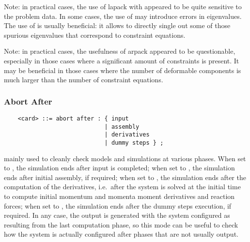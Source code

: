Note: in practical cases, the use of lapack with 
appeared to be quite sensitive to the problem data.
In some cases, the use of  may introduce errors
in eigenvalues.
The use of  is usually beneficial: it allows to directly
single out some of those spurious eigenvalues that correspond
to constraint equations.

Note: in practical cases, the usefulness of arpack appeared
to be questionable, especially in those cases where a significant amount
of constraints is present.
It may be beneficial in those cases where the number of deformable components
is much larger than the number of constraint equations.



\subsubsection{Abort After}
\label{sec:IVP:abort after}
\begin{verbatim}
    <card> ::= abort after : { input 
                             | assembly 
                             | derivatives 
                             | dummy steps } ;
\end{verbatim}
mainly used to cleanly check models and simulations at various phases.
When set to , the simulation ends after input is completed;
when set to , the simulation ends after initial assembly,
if required;
when set to , the simulation ends after the computation
of the derivatives, i.e.\ after the system is solved at the initial
time to compute initial momentum and momenta moment derivatives and 
reaction forces;
when set to , the simulation ends after the dummy steps
execution, if required.
In any case, the output is generated with the system configured 
as resulting from the last computation phase, so this mode can be useful 
to check how the system is actually configured after phases that are not 
usually output.



